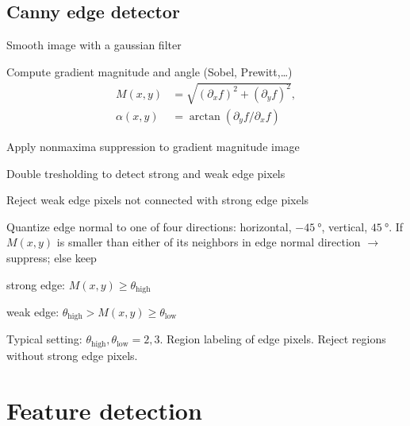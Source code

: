 \subsection{Canny edge detector}
\begin{inparaenum}[\itshape(1)]
	\item Smooth image with a gaussian filter
	\item Compute gradient magnitude and angle (Sobel, Prewitt,\ldots)
		\begin{align*}
			M(x,y)&=\sqrt{\left( \partial_xf \right)^2+\left( \partial_yf \right)^2},\\
			\alpha(x,y)&=\arctan\left( \partial_yf/\partial_xf \right)
		\end{align*}
	\item Apply nonmaxima suppression to gradient magnitude image
	\item Double tresholding to detect strong and weak edge pixels
	\item Reject weak edge pixels not connected with strong edge pixels
\end{inparaenum}
\begin{compactdesc}
	\item[\lp{Canny nonmaxima suppression}] Quantize edge normal to one of four directions: horizontal, $\SI{-45}{\degree}$, vertical, $\SI{+45}{\degree}$. If $M(x,y)$ is smaller than either of its neighbors in edge normal direction $\to$ suppress; else keep
	\item[\lp{Double-thresh. of grad. magn.}]\mbox{}
		\begin{compactdesc}
			\item[strong edge:] $M(x,y)\geq\theta_{\text{high}}$
			\item[weak edge:] $\theta_{\text{high}}>M(x,y)\geq\theta_{\text{low}}$
		\end{compactdesc}
		Typical setting: $\theta_{\text{high}},\theta_{\text{low}}=2,3$. Region labeling of edge pixels. Reject regions without strong edge pixels.
\end{compactdesc}
\section{Feature detection}
